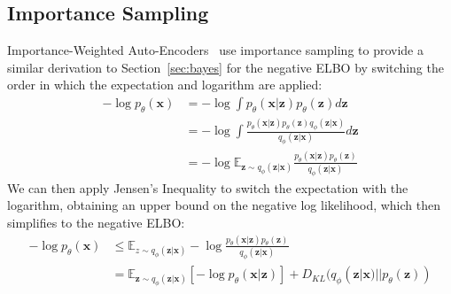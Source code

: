 \documentclass{article}
\begin{document}
\subsection{Importance Sampling}
\label{sec:importance}
Importance-Weighted Auto-Encoders~\cite{burda2015importance} use importance sampling to provide a similar derivation to Section~\ref{sec:bayes} for the negative ELBO by switching the order in which the expectation and logarithm are applied:
\begin{align}
    -\log p_\theta(\mathbf{x}) &=-\log  \int p_\theta(\mathbf{x}|\mathbf{z}) p_\theta(\mathbf{z}) d\mathbf{z}\\
    &= -\log \int \frac{p_\theta(\mathbf{x}|\mathbf{z}) p_\theta(\mathbf{z}) q_\phi(\mathbf{z}|\mathbf{x})}{q_\phi(\mathbf{z}|\mathbf{x})} d\mathbf{z}\\
 &=-\log \mathbb{E}_{\mathbf{z}\sim q_\phi(\mathbf{z}|\mathbf{x})} \frac{p_\theta(\mathbf{x}|\mathbf{z}) p_\theta(\mathbf{z})}{q_\phi(\mathbf{z}|\mathbf{x})} \label{eq:expectationq}
\end{align}
We can then apply Jensen's Inequality to switch the expectation with the logarithm, obtaining an upper bound on the negative log likelihood, which then simplifies to the negative ELBO:
\begin{align}
    -\log p_\theta(\mathbf{x})  &\leq \mathbb{E}_{z\sim q_\phi(\mathbf{z}|\mathbf{x})} -\log \frac{p_\theta(\mathbf{x}|\mathbf{z}) p_\theta(\mathbf{z})}{q_\phi(\mathbf{z}|\mathbf{x})} \label{eq:jensen}\\
    &=\mathbb{E}_{\mathbf{z}\sim q_\phi(\mathbf{z}|\mathbf{x})} [-\log p_\theta(\mathbf{x}|\mathbf{z})]
		 + D_{KL}(q_\phi(\mathbf{z}|\mathbf{x}) || p_\theta(\mathbf{z})) 
\end{align} 
\end{document}
